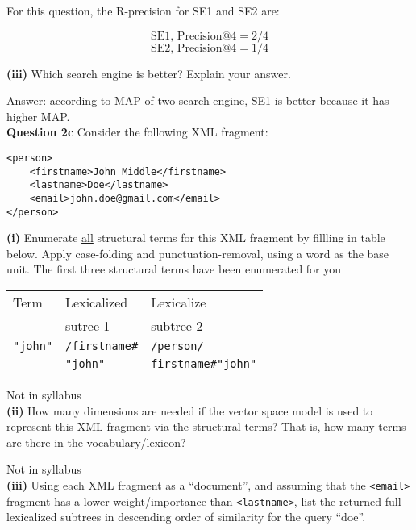 \documentclass[11pt,a4paper]{report}
\begin{document}
\begin{multicols*}{2}
\noindent For this question, the R-precision for SE1 and SE2 are:

$$\text{SE1, Precision@4}=2/4$$
$$\text{SE2, Precision@4}=1/4$$

\noindent \textbf{(iii)} Which search engine is better? Explain your answer.

\noindent Answer: according to MAP of two search engine, SE1 is better because it has higher MAP. \\

\noindent \textbf{Question 2c} Consider the following XML fragment:

\begin{verbatim}
<person>
    <firstname>John Middle</firstname>
    <lastname>Doe</lastname>
    <email>john.doe@gmail.com</email>
</person>
\end{verbatim}

\noindent \textbf{(i)} Enumerate \underline{all} structural terms for this XML fragment by fillling in table below. Apply case-folding and punctuation-removal, using a word as the base unit. The first three structural terms have been enumerated for you

\begin{center}
\begin{tabular}{| l | l | l |}
    \hline
    Term & Lexicalized & Lexicalize \\
         & sutree 1    & subtree 2  \\
    \hline
    \verb|"john"| & \verb|/firstname#| & \verb|/person/|\\
                  & \verb|"john"|      & \verb|firstname#"john"| \\
    \hline
\end{tabular}
\end{center}

\noindent Not in syllabus\\

\noindent \textbf{(ii)} How many dimensions are needed if the vector space model is used to represent this XML fragment via the structural terms? That is, how many terms are there in the vocabulary/lexicon?

\noindent Not in syllabus\\

\noindent \textbf{(iii)} Using each XML fragment as a ``document'', and assuming that the \verb|<email>| fragment has a lower weight/importance than \verb|<lastname>|, list the returned full lexicalized subtrees in descending order of similarity for the query ``doe''.


\end{multicols*}
\end{document}
